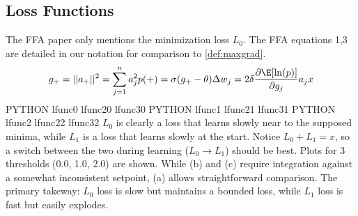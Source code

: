 \subsection{Loss Functions}
The FFA paper \cite{FFA23} only mentions the minimization loss $L_0$.
The FFA equations 1,3 are detailed in our notation for comparison to \ref{def:maxgrad}.
\[
g_+ = ||a_+||^2 = \sum_{j=1}^n a_j^2 \\
p(+) = \sigma(g_+ - \theta) \\
\Delta w_j = 2 \delta \frac{\partial \E[\ln(p)]}{\partial g_j} a_j x
\]
PYTHON lfunc0 lfunc20 lfunc30
PYTHON lfunc1 lfunc21 lfunc31
PYTHON lfunc2 lfunc22 lfunc32
$L_0$ is clearly a loss that learns slowly near to the supposed minima, while $L_1$ is a loss that learns slowly at the start.
Notice $L_0 + L_1 = x$, so a switch between the two during learning ($L_0 \rightarrow L_1$) should be best.
Plots for 3 thresholds (0.0, 1.0, 2.0) are shown. While (b) and (c) require integration against a somewhat inconsistent setpoint, (a) allows straightforward comparison.
The primary takeway: $L_0$ loss is slow but maintains a bounded loss, while $L_1$ loss is fast but easily explodes.

